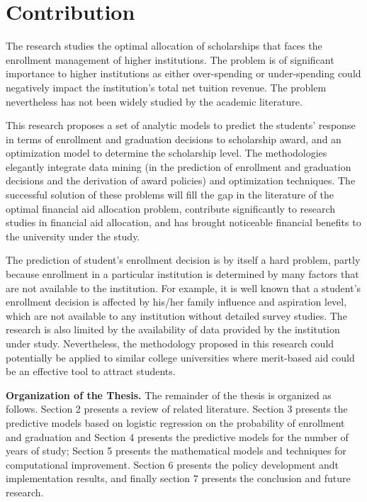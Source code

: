 \documentclass[12pt,english]{report}
\begin{document}
\section{Contribution}
The research studies the optimal allocation of scholarships that faces the enrollment management of higher institutions.  The problem is of significant importance to higher institutions as either over-spending or under-spending could negatively impact the institution's total net tuition revenue.  The problem nevertheless has not been widely studied by the academic literature.

This research proposes a set of analytic models to predict the students' response in terms of enrollment and graduation decisions to scholarship award, and an optimization model to determine the scholarship level.  The methodologies elegantly integrate data mining (in the prediction of enrollment and graduation decisions and the derivation of award policies) and optimization techniques. The successful solution of these problems will fill the gap in the literature of the optimal financial aid allocation problem, contribute significantly to research studies in financial aid allocation, and has brought noticeable financial benefits to the university under the study.

The prediction of student's enrollment decision is by itself a hard problem, partly because enrollment in a particular institution is determined by many factors that are not available to the institution.  For example, it is well known that a student's enrollment decision is affected by his/her family influence and aspiration level, which are not available to any institution without detailed survey studies.  The research is also limited by the availability of data provided by the institution under study.   Nevertheless, the methodology proposed in this research could potentially be applied to similar college universities where merit-based aid could be an effective tool to attract students.

\vspace{0.25in}
\noindent \textbf{Organization of the Thesis.} The remainder of the thesis is organized as follows. Section 2 presents a review of related literature. Section 3 presents the predictive models based on logistic regression on the probability of enrollment and graduation and Section 4 presents the predictive models for the number of years of study; Section 5 presents the mathematical models and techniques for computational improvement. Section 6 presents the policy development andt implementation results, and finally section 7 presents the conclusion and  future research.
\end{document}
